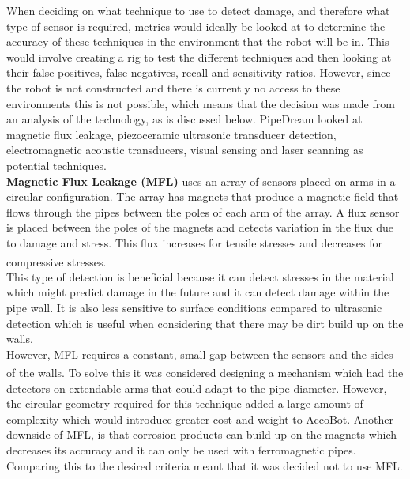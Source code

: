 \documentclass[11pt]{article}		%
\newcommand{\supercite}[1]{\textsuperscript{\cite{#1}}}		%
\begin{document}
        When deciding on what technique to use to detect damage, and therefore what type of sensor is required, metrics would ideally be looked at to determine the accuracy of these techniques in the environment that the robot will be in. This would involve creating a rig to test the different techniques and then looking at their false positives, false negatives, recall and sensitivity ratios. However, since the robot is not constructed and there is currently no access to these environments this is not possible,  which means that the decision was made from an analysis of the technology, as is discussed below. PipeDream looked at magnetic flux leakage, piezoceramic ultrasonic transducer detection, electromagnetic acoustic transducers, visual sensing and laser scanning as potential techniques.
        \\\hspace*{2ex}
	        \textbf{Magnetic Flux Leakage (MFL)} uses an array of sensors placed on arms in a circular configuration. The array has magnets that produce a magnetic field that flows through the pipes between the poles of each arm of the array. A flux sensor is placed between the poles of the magnets and detects variation in the flux due to damage and stress. This flux increases for tensile stresses and decreases for compressive stresses\supercite{MFL_explanation}.
	        \\
            \hspace*{2ex}This type of detection is beneficial because it can detect stresses in the material which might predict damage in the future and it can detect damage within the pipe wall. It is also less sensitive to surface conditions compared to ultrasonic detection which is useful when considering that there may be dirt build up on the walls.
	        \\
            \hspace*{2ex}However, MFL requires a constant, small gap between the sensors and the sides of the walls\supercite{MFL_explanation}. To solve this it was considered designing a mechanism which had the detectors on extendable arms that could adapt to the pipe diameter. However, the circular geometry required for this technique added a large amount of complexity which would introduce greater cost and weight to AccoBot. Another downside of MFL, is that corrosion products can build up on the magnets which decreases its accuracy and it can only be used with ferromagnetic pipes. Comparing this to the desired criteria meant that it was decided not to use MFL. 
	        \\\hspace*{2ex}
\end{document}
